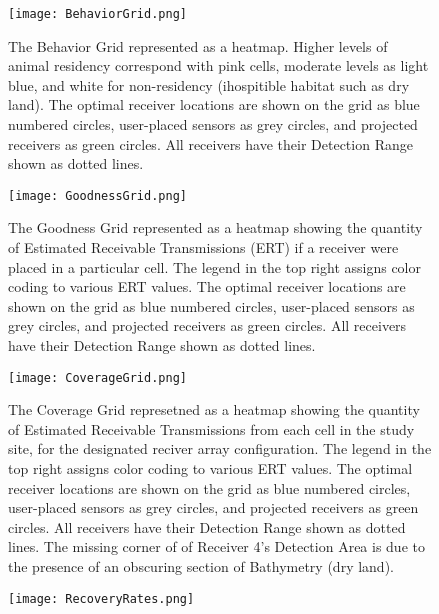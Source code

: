 	\begin{figure}[t]
		\texttt{[image: BehaviorGrid.png]}
		\caption{The Behavior Grid represented as a heatmap.  Higher levels of animal residency correspond with pink cells, moderate levels as light blue, and white for non-residency (ihospitible habitat such as  dry land).  The optimal receiver locations are shown on the grid as blue numbered circles, user-placed sensors as grey circles, and projected receivers as green circles.  All receivers have their Detection Range shown as dotted lines.}\label{animalGraph}
	\end{figure}
	
	\begin{figure}[t]
		\texttt{[image: GoodnessGrid.png]}
		\caption{The Goodness Grid represented as a heatmap showing the quantity of Estimated Receivable Transmissions (ERT) if a receiver were placed in a particular cell.  The legend in the top right assigns color coding to various ERT values. The optimal receiver locations are shown on the grid as blue numbered circles, user-placed sensors as grey circles, and projected receivers as green circles.  All receivers have their Detection Range shown as dotted lines.} \label{goodnessGraph}
	\end{figure}

	\begin{figure}[t]
		\texttt{[image: CoverageGrid.png]}
		\caption{The Coverage Grid represetned as a heatmap showing the quantity of Estimated Receivable Transmissions from each cell in the study site, for the designated reciver array configuration.  The legend in the top right assigns color coding to various ERT values.  The optimal receiver locations are shown on the grid as blue numbered circles, user-placed sensors as grey circles, and projected receivers as green circles.  All receivers have their Detection Range shown as dotted lines.  The missing corner of of Receiver 4's Detection Area is due to the presence of an obscuring section of Bathymetry (dry land).}\label{coverageGraph}
	\end{figure}

	\begin{figure}[t]
		\texttt{[image: RecoveryRates.png]}
		\caption{} \label{recoveryGraph}
	\end{figure}
